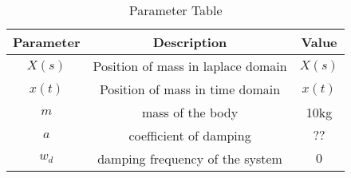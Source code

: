 \begin{table}[H]
    \center
    \renewcommand\thetable{1}
 

\def\arraystretch{3}
\begin{adjustbox}{width=0.5\textwidth}
    \begin{tabular}{|c|c|c|}
    \hline
        \textbf{Parameter}&\textbf{Description}&\textbf{Value}\\
        \hline
        $X(s)$&Position of mass in laplace domain&$X(s)$\\
        \hline
        $x(t)$&Position of mass in time domain&$x(t)$ \\
        \hline
        $m$ &mass of the body&10kg \\
        \hline
        $a$&coefficient of damping &$??$ \\
        \hline
        $w_d$&damping frequency of the system&$0$ \\
        \hline
       \end{tabular} 
            \end{adjustbox}
    \caption{Parameter Table}

    \label{tab:gate2021.tex}
\end{table}
